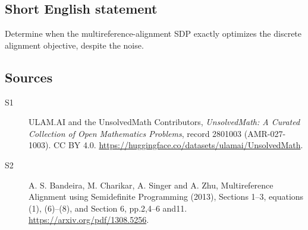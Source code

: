 \documentclass[11pt]{article}
\begin{document}
\subsection{Short English statement}
Determine when the multireference-alignment SDP exactly optimizes the discrete alignment objective, despite the noise.
\subsection{Sources}
\begin{description}
\item[\hypertarget{source:2801003:1}{S1}] ULAM.AI and the UnsolvedMath Contributors, \emph{UnsolvedMath: A Curated Collection of Open Mathematics Problems}, record 2801003 (AMR-027-1003). CC BY 4.0. \url{https://huggingface.co/datasets/ulamai/UnsolvedMath}.
\item[\hypertarget{source:2801003:2}{S2}] A. S. Bandeira, M. Charikar, A. Singer and A. Zhu, Multireference Alignment using Semidefinite Programming (2013), Sections 1--3, equations (1), (6)--(8), and Section 6, pp.2,4--6 and11. \url{https://arxiv.org/pdf/1308.5256}.
\end{description}
\label{end:2801003}
\end{document}
